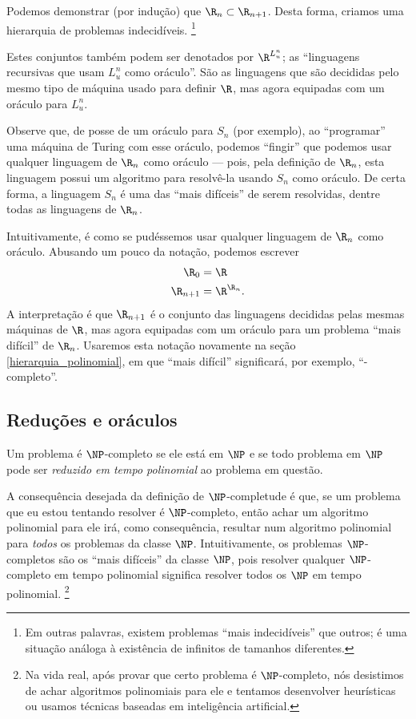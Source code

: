 Podemos demonstrar (por indução) que $\R_n \subset \R_{n+1}$.
Desta forma,
criamos uma hierarquia de problemas indecidíveis.
\footnote{
    Em outras palavras,
    existem problemas ``mais indecidíveis'' que outros;
    é uma situação análoga à existência de infinitos de tamanhos diferentes.
}

Estes conjuntos também podem ser denotados por $\R^{L_u^n}$;
as ``linguagens recursivas que usam $L_u^n$ como oráculo''.
São as linguagens que são decididas
pelo mesmo tipo de máquina usado para definir $\R$,
mas agora equipadas com um oráculo para $L_u^n$.

Observe que,
de posse de um oráculo para $S_n$ (por exemplo),
ao ``programar'' uma máquina de Turing com esse oráculo,
podemos ``fingir'' que podemos usar qualquer linguagem de $\R_n$ como oráculo
--- pois, pela definição de $\R_n$,
esta linguagem possui um algoritmo para resolvê-la
usando $S_n$ como oráculo.
De certa forma,
a linguagem $S_n$ é uma das ``mais difíceis'' de serem resolvidas,
dentre todas as linguagens de $\R_n$.

Intuitivamente, é como se pudéssemos usar qualquer linguagem de $\R_n$ como oráculo.
Abusando um pouco da notação,
podemos escrever
\begin{equation}
    \begin{aligned}
        \R_0 &= \R \\
        \R_{n+1} &= \R^{\R_n}.
    \end{aligned}
    \label{abuso_notacao_oraculos}
\end{equation}
A interpretação é que $\R_{n+1}$ é o conjunto das linguagens
decididas pelas mesmas máquinas de $\R$,
mas agora equipadas com um oráculo para um problema ``mais difícil'' de $\R_n$.
Usaremos esta notação novamente na seção \ref{hierarquia_polinomial},
em que ``mais difícil'' significará,
por exemplo, ``\NP-completo''.

\subsection{Reduções e oráculos}

Um problema é $\NP$-completo se
ele está em $\NP$
e se todo problema em $\NP$ pode ser \emph{reduzido em tempo polinomial}
ao problema em questão.

A consequência desejada da definição de $\NP$-completude é que,
se um problema que eu estou tentando resolver é $\NP$-completo,
então achar um algoritmo polinomial para ele
irá, como consequência,
resultar num algoritmo polinomial para \emph{todos} os problemas da classe $\NP$.
Intuitivamente,
os problemas $\NP$-completos são os ``mais difíceis'' da classe $\NP$,
pois resolver qualquer $\NP$-completo em tempo polinomial
significa resolver todos os $\NP$ em tempo polinomial.
\footnote{
    Na vida real,
    após provar que certo problema é $\NP$-completo,
    nós desistimos de achar algoritmos polinomiais para ele
    e tentamos desenvolver heurísticas
    ou usamos técnicas baseadas em inteligência artificial.
}

